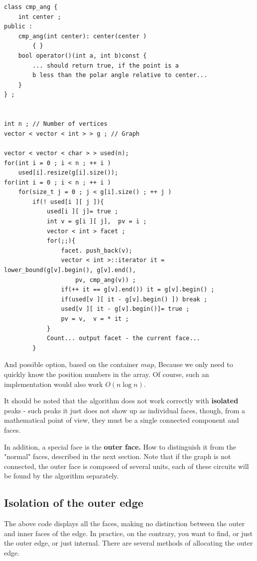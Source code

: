 \begin{verbatim}
class cmp_ang {
    int center ;
public :
    cmp_ang(int center): center(center )
        { }
    bool operator()(int a, int b)const {
        ... should return true, if the point is a
        b less than the polar angle relative to center...
    }
} ;
 
 
int n ; // Number of vertices
vector < vector < int > > g ; // Graph
 
vector < vector < char > > used(n);
for(int i = 0 ; i < n ; ++ i )
    used[i].resize(g[i].size());
for(int i = 0 ; i < n ; ++ i )
    for(size_t j = 0 ; j < g[i].size() ; ++ j )
        if(! used[i ][ j ]){
            used[i ][ j]= true ;
            int v = g[i ][ j],  pv = i ;
            vector < int > facet ;
            for(;;){
                facet. push_back(v);
                vector < int >::iterator it = lower_bound(g[v].begin(), g[v].end(),
                    pv, cmp_ang(v)) ;
                if(++ it == g[v].end()) it = g[v].begin() ;
                if(used[v ][ it - g[v].begin() ]) break ;
                used[v ][ it - g[v].begin()]= true ;
                pv = v,  v = * it ;
            }
            Count... output facet - the current face...
        } 
\end{verbatim}
And possible option, based on the container $map$, Because we only need to quickly know the position numbers in the array. Of course, such an implementation would also work $O (n \log n)$.

It should be noted that the algorithm does not work correctly with \textbf{isolated} peaks - such peaks it just does not show up as individual faces, though, from a mathematical point of view, they must be a single connected component and faces.

In addition, a special face is the \textbf{outer face.} How to distinguish it from the "normal" faces, described in the next section. Note that if the graph is not connected, the outer face is composed of several units, each of these circuits will be found by the algorithm separately.

\subsection{ Isolation of the outer edge }

The above code displays all the faces, making no distinction between the outer and inner faces of the edge. In practice, on the contrary, you want to find, or just the outer edge, or just internal. There are several methods of allocating the outer edge.

